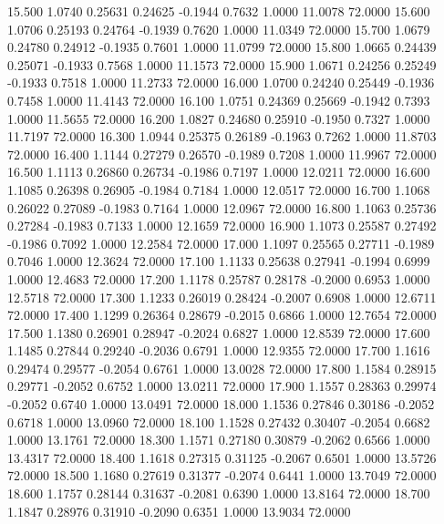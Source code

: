   15.500   1.0740   0.25631   0.24625  -0.1944   0.7632   1.0000  11.0078  72.0000
  15.600   1.0706   0.25193   0.24764  -0.1939   0.7620   1.0000  11.0349  72.0000
  15.700   1.0679   0.24780   0.24912  -0.1935   0.7601   1.0000  11.0799  72.0000
  15.800   1.0665   0.24439   0.25071  -0.1933   0.7568   1.0000  11.1573  72.0000
  15.900   1.0671   0.24256   0.25249  -0.1933   0.7518   1.0000  11.2733  72.0000
  16.000   1.0700   0.24240   0.25449  -0.1936   0.7458   1.0000  11.4143  72.0000
  16.100   1.0751   0.24369   0.25669  -0.1942   0.7393   1.0000  11.5655  72.0000
  16.200   1.0827   0.24680   0.25910  -0.1950   0.7327   1.0000  11.7197  72.0000
  16.300   1.0944   0.25375   0.26189  -0.1963   0.7262   1.0000  11.8703  72.0000
  16.400   1.1144   0.27279   0.26570  -0.1989   0.7208   1.0000  11.9967  72.0000
  16.500   1.1113   0.26860   0.26734  -0.1986   0.7197   1.0000  12.0211  72.0000
  16.600   1.1085   0.26398   0.26905  -0.1984   0.7184   1.0000  12.0517  72.0000
  16.700   1.1068   0.26022   0.27089  -0.1983   0.7164   1.0000  12.0967  72.0000
  16.800   1.1063   0.25736   0.27284  -0.1983   0.7133   1.0000  12.1659  72.0000
  16.900   1.1073   0.25587   0.27492  -0.1986   0.7092   1.0000  12.2584  72.0000
  17.000   1.1097   0.25565   0.27711  -0.1989   0.7046   1.0000  12.3624  72.0000
  17.100   1.1133   0.25638   0.27941  -0.1994   0.6999   1.0000  12.4683  72.0000
  17.200   1.1178   0.25787   0.28178  -0.2000   0.6953   1.0000  12.5718  72.0000
  17.300   1.1233   0.26019   0.28424  -0.2007   0.6908   1.0000  12.6711  72.0000
  17.400   1.1299   0.26364   0.28679  -0.2015   0.6866   1.0000  12.7654  72.0000
  17.500   1.1380   0.26901   0.28947  -0.2024   0.6827   1.0000  12.8539  72.0000
  17.600   1.1485   0.27844   0.29240  -0.2036   0.6791   1.0000  12.9355  72.0000
  17.700   1.1616   0.29474   0.29577  -0.2054   0.6761   1.0000  13.0028  72.0000
  17.800   1.1584   0.28915   0.29771  -0.2052   0.6752   1.0000  13.0211  72.0000
  17.900   1.1557   0.28363   0.29974  -0.2052   0.6740   1.0000  13.0491  72.0000
  18.000   1.1536   0.27846   0.30186  -0.2052   0.6718   1.0000  13.0960  72.0000
  18.100   1.1528   0.27432   0.30407  -0.2054   0.6682   1.0000  13.1761  72.0000
  18.300   1.1571   0.27180   0.30879  -0.2062   0.6566   1.0000  13.4317  72.0000
  18.400   1.1618   0.27315   0.31125  -0.2067   0.6501   1.0000  13.5726  72.0000
  18.500   1.1680   0.27619   0.31377  -0.2074   0.6441   1.0000  13.7049  72.0000
  18.600   1.1757   0.28144   0.31637  -0.2081   0.6390   1.0000  13.8164  72.0000
  18.700   1.1847   0.28976   0.31910  -0.2090   0.6351   1.0000  13.9034  72.0000
